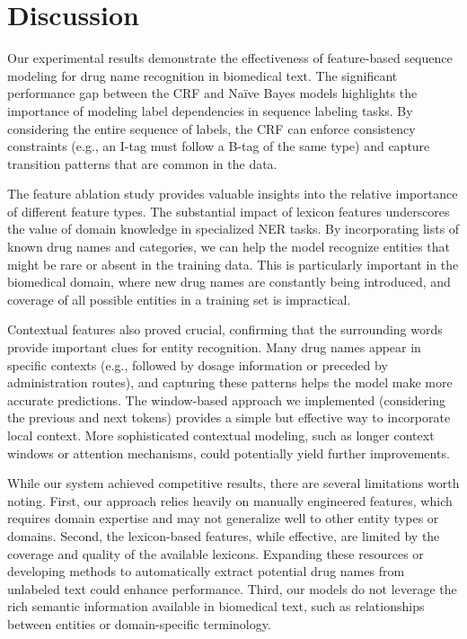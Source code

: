 \section{Discussion}
\label{sec:discussion}

Our experimental results demonstrate the effectiveness of feature-based sequence modeling for drug name recognition in biomedical text. The significant performance gap between the CRF and Naïve Bayes models highlights the importance of modeling label dependencies in sequence labeling tasks. By considering the entire sequence of labels, the CRF can enforce consistency constraints (e.g., an I-tag must follow a B-tag of the same type) and capture transition patterns that are common in the data.

The feature ablation study provides valuable insights into the relative importance of different feature types. The substantial impact of lexicon features underscores the value of domain knowledge in specialized NER tasks. By incorporating lists of known drug names and categories, we can help the model recognize entities that might be rare or absent in the training data. This is particularly important in the biomedical domain, where new drug names are constantly being introduced, and coverage of all possible entities in a training set is impractical.

Contextual features also proved crucial, confirming that the surrounding words provide important clues for entity recognition. Many drug names appear in specific contexts (e.g., followed by dosage information or preceded by administration routes), and capturing these patterns helps the model make more accurate predictions. The window-based approach we implemented (considering the previous and next tokens) provides a simple but effective way to incorporate local context. More sophisticated contextual modeling, such as longer context windows or attention mechanisms, could potentially yield further improvements.

While our system achieved competitive results, there are several limitations worth noting. First, our approach relies heavily on manually engineered features, which requires domain expertise and may not generalize well to other entity types or domains. Second, the lexicon-based features, while effective, are limited by the coverage and quality of the available lexicons. Expanding these resources or developing methods to automatically extract potential drug names from unlabeled text could enhance performance. Third, our models do not leverage the rich semantic information available in biomedical text, such as relationships between entities or domain-specific terminology.

